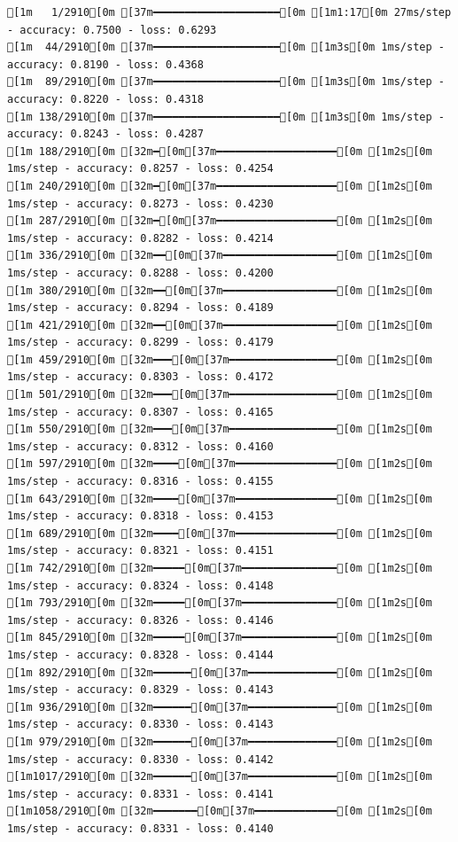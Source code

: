 \documentclass[
  letterpaper,
  DIV=11,
  numbers=noendperiod]{scrartcl}
\begin{document}
\begin{verbatim}
[1m   1/2910[0m [37m━━━━━━━━━━━━━━━━━━━━[0m [1m1:17[0m 27ms/step - accuracy: 0.7500 - loss: 0.6293
[1m  44/2910[0m [37m━━━━━━━━━━━━━━━━━━━━[0m [1m3s[0m 1ms/step - accuracy: 0.8190 - loss: 0.4368   
[1m  89/2910[0m [37m━━━━━━━━━━━━━━━━━━━━[0m [1m3s[0m 1ms/step - accuracy: 0.8220 - loss: 0.4318
[1m 138/2910[0m [37m━━━━━━━━━━━━━━━━━━━━[0m [1m3s[0m 1ms/step - accuracy: 0.8243 - loss: 0.4287
[1m 188/2910[0m [32m━[0m[37m━━━━━━━━━━━━━━━━━━━[0m [1m2s[0m 1ms/step - accuracy: 0.8257 - loss: 0.4254
[1m 240/2910[0m [32m━[0m[37m━━━━━━━━━━━━━━━━━━━[0m [1m2s[0m 1ms/step - accuracy: 0.8273 - loss: 0.4230
[1m 287/2910[0m [32m━[0m[37m━━━━━━━━━━━━━━━━━━━[0m [1m2s[0m 1ms/step - accuracy: 0.8282 - loss: 0.4214
[1m 336/2910[0m [32m━━[0m[37m━━━━━━━━━━━━━━━━━━[0m [1m2s[0m 1ms/step - accuracy: 0.8288 - loss: 0.4200
[1m 380/2910[0m [32m━━[0m[37m━━━━━━━━━━━━━━━━━━[0m [1m2s[0m 1ms/step - accuracy: 0.8294 - loss: 0.4189
[1m 421/2910[0m [32m━━[0m[37m━━━━━━━━━━━━━━━━━━[0m [1m2s[0m 1ms/step - accuracy: 0.8299 - loss: 0.4179
[1m 459/2910[0m [32m━━━[0m[37m━━━━━━━━━━━━━━━━━[0m [1m2s[0m 1ms/step - accuracy: 0.8303 - loss: 0.4172
[1m 501/2910[0m [32m━━━[0m[37m━━━━━━━━━━━━━━━━━[0m [1m2s[0m 1ms/step - accuracy: 0.8307 - loss: 0.4165
[1m 550/2910[0m [32m━━━[0m[37m━━━━━━━━━━━━━━━━━[0m [1m2s[0m 1ms/step - accuracy: 0.8312 - loss: 0.4160
[1m 597/2910[0m [32m━━━━[0m[37m━━━━━━━━━━━━━━━━[0m [1m2s[0m 1ms/step - accuracy: 0.8316 - loss: 0.4155
[1m 643/2910[0m [32m━━━━[0m[37m━━━━━━━━━━━━━━━━[0m [1m2s[0m 1ms/step - accuracy: 0.8318 - loss: 0.4153
[1m 689/2910[0m [32m━━━━[0m[37m━━━━━━━━━━━━━━━━[0m [1m2s[0m 1ms/step - accuracy: 0.8321 - loss: 0.4151
[1m 742/2910[0m [32m━━━━━[0m[37m━━━━━━━━━━━━━━━[0m [1m2s[0m 1ms/step - accuracy: 0.8324 - loss: 0.4148
[1m 793/2910[0m [32m━━━━━[0m[37m━━━━━━━━━━━━━━━[0m [1m2s[0m 1ms/step - accuracy: 0.8326 - loss: 0.4146
[1m 845/2910[0m [32m━━━━━[0m[37m━━━━━━━━━━━━━━━[0m [1m2s[0m 1ms/step - accuracy: 0.8328 - loss: 0.4144
[1m 892/2910[0m [32m━━━━━━[0m[37m━━━━━━━━━━━━━━[0m [1m2s[0m 1ms/step - accuracy: 0.8329 - loss: 0.4143
[1m 936/2910[0m [32m━━━━━━[0m[37m━━━━━━━━━━━━━━[0m [1m2s[0m 1ms/step - accuracy: 0.8330 - loss: 0.4143
[1m 979/2910[0m [32m━━━━━━[0m[37m━━━━━━━━━━━━━━[0m [1m2s[0m 1ms/step - accuracy: 0.8330 - loss: 0.4142
[1m1017/2910[0m [32m━━━━━━[0m[37m━━━━━━━━━━━━━━[0m [1m2s[0m 1ms/step - accuracy: 0.8331 - loss: 0.4141
[1m1058/2910[0m [32m━━━━━━━[0m[37m━━━━━━━━━━━━━[0m [1m2s[0m 1ms/step - accuracy: 0.8331 - loss: 0.4140

\end{verbatim}
\end{document}
